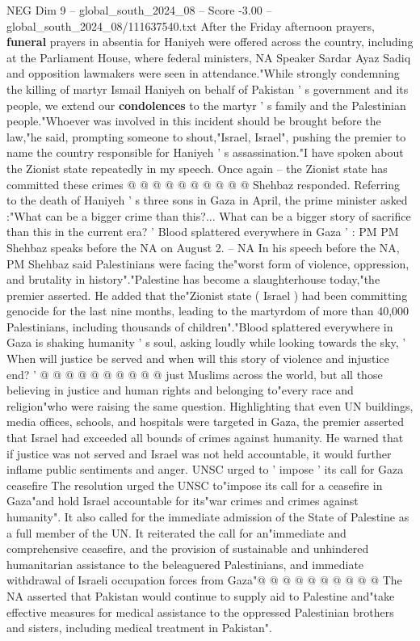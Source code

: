 \begin{textsample}{NEG Dim 9 – global\_south\_2024\_08 – Score -3.00 – global\_south\_2024\_08/111637540.txt}
After the Friday afternoon prayers, \textbf{funeral} prayers in absentia for Haniyeh were offered across the country, including at the Parliament House, where federal ministers, NA Speaker Sardar Ayaz Sadiq and opposition lawmakers were seen in attendance."While strongly condemning the killing of martyr Ismail Haniyeh on behalf of Pakistan ' s government and its people, we extend our \textbf{condolences} to the martyr ' s family and the Palestinian people."Whoever was involved in this incident should be brought before the law,"he said, prompting someone to shout,"Israel, Israel", pushing the premier to name the country responsible for Haniyeh ' s assassination."I have spoken about the Zionist state repeatedly in my speech.
Once again -- the Zionist state has committed these crimes @ @ @ @ @ @ @ @ @ @ Shehbaz responded.
Referring to the death of Haniyeh ' s three sons in Gaza in April, the prime minister asked :"What can be a bigger crime than this?...
What can be a bigger story of sacrifice than this in the current era? ' Blood splattered everywhere in Gaza ' : PM PM Shehbaz speaks before the NA on August 2. -- NA In his speech before the NA, PM Shehbaz said Palestinians were facing the"worst form of violence, oppression, and brutality in history"."Palestine has become a slaughterhouse today,"the premier asserted.
He added that the"Zionist state ( Israel ) had been committing genocide for the last nine months, leading to the martyrdom of more than 40,000 Palestinians, including thousands of children"."Blood splattered everywhere in Gaza is shaking humanity ' s soul, asking loudly while looking towards the sky, ' When will justice be served and when will this story of violence and injustice end? ' @ @ @ @ @ @ @ @ @ @ just Muslims across the world, but all those believing in justice and human rights and belonging to"every race and religion"who were raising the same question.
Highlighting that even UN buildings, media offices, schools, and hospitals were targeted in Gaza, the premier asserted that Israel had exceeded all bounds of crimes against humanity.
He warned that if justice was not served and Israel was not held accountable, it would further inflame public sentiments and anger.
UNSC urged to ' impose ' its call for Gaza ceasefire The resolution urged the UNSC to"impose its call for a ceasefire in Gaza"and hold Israel accountable for its"war crimes and crimes against humanity".
It also called for the immediate admission of the State of Palestine as a full member of the UN.
It reiterated the call for an"immediate and comprehensive ceasefire, and the provision of sustainable and unhindered humanitarian assistance to the beleaguered Palestinians, and immediate withdrawal of Israeli occupation forces from Gaza"@ @ @ @ @ @ @ @ @ @ The NA asserted that Pakistan would continue to supply aid to Palestine and"take effective measures for medical assistance to the oppressed Palestinian brothers and sisters, including medical treatment in Pakistan".

\end{textsample}
